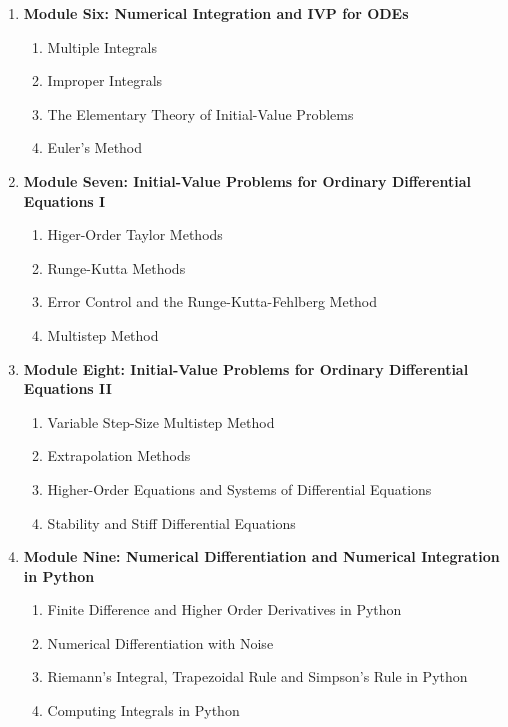 \begin{enumerate}[label=\arabic*.]
\begin{enumerate}[label=(\roman*)]
\item Composite Numerical Integration
\item Romberg Integration
\item Adaptive Quadrature Methods
\item Gaussian Quadrature
\end{enumerate}
\item {\bf Module Six: Numerical Integration and IVP for ODEs}
\begin{enumerate}[label=(\roman*)]
\item Multiple Integrals
\item Improper Integrals
\item The Elementary Theory of Initial-Value Problems
\item Euler's Method
\end{enumerate}
\item {\bf Module Seven: Initial-Value Problems for Ordinary Differential Equations I}
\begin{enumerate}[label=(\roman*)]
\item Higer-Order Taylor Methods
\item Runge-Kutta Methods
\item Error Control and the Runge-Kutta-Fehlberg Method
\item Multistep Method
\end{enumerate}
\item {\bf Module Eight: Initial-Value Problems for Ordinary Differential Equations II}
\begin{enumerate}[label=(\roman*)]
\item Variable Step-Size Multistep Method
\item Extrapolation Methods
\item Higher-Order Equations and Systems of Differential Equations
\item Stability and Stiff Differential Equations
\end{enumerate}
\item {\bf Module Nine: Numerical Differentiation and Numerical Integration in Python}
\begin{enumerate}[label=(\roman*)]
\item Finite Difference and Higher Order Derivatives in Python
\item Numerical Differentiation with Noise
\item Riemann’s Integral, Trapezoidal Rule and Simpson’s Rule in Python
\item Computing Integrals in Python
\end{enumerate}

\end{enumerate}

